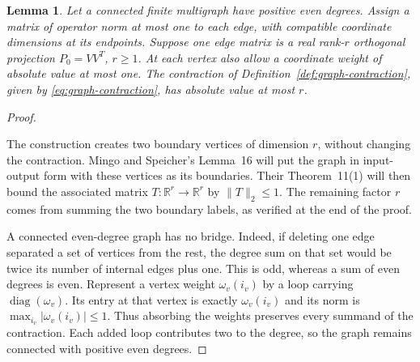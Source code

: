 \documentclass[11pt]{article}
\newtheorem{lemma}[theorem]{Lemma}
\theoremstyle{definition}
\theoremstyle{remark}
\theoremstyle{plain}
\newcommand{\R}{\mathbb R}
\DeclareMathOperator{\diag}{diag}
\begin{document}
\begin{lemma}\label{lem:graph}
Let a connected finite multigraph have positive even degrees. Assign
a matrix of operator norm at most one to each edge, with compatible
coordinate dimensions at its endpoints. Suppose one edge matrix is a
real rank-\(r\) orthogonal projection \(P_0=VV^T\), \(r\ge1\).
At each vertex also allow a coordinate weight of absolute value at most
one. The contraction of Definition~\ref{def:graph-contraction},
given by \eqref{eq:graph-contraction}, has absolute value
at most \(r\).
\end{lemma}
\begin{proof}
\begin{samepage}
The construction creates two boundary vertices of dimension $r$, without
changing the contraction. Mingo and Speicher's Lemma~16
\cite{mingo} will put the graph in input-output form with these
vertices as its boundaries. Their Theorem~11(1) will then bound
the associated matrix $T:\R^r\to\R^r$ by $\|T\|_2\le1$.
The remaining factor $r$ comes from summing the two boundary
labels, as verified at the end of the proof.
\par
\end{samepage}

A connected even-degree graph has no bridge. Indeed, if deleting one
edge separated a set of vertices from the rest, the degree sum on
that set would be twice its number of internal edges plus one.
This is odd, whereas a sum of even degrees is even.
Represent a vertex weight $\omega_v(i_v)$ by a loop carrying
$\diag(\omega_v)$. Its entry at that vertex is exactly
$\omega_v(i_v)$ and its norm is $\max_{i_v}|\omega_v(i_v)|\le1$.
Thus absorbing the weights preserves every summand of the
contraction. Each added loop contributes two to the degree, so
the graph remains connected with positive even degrees.


\end{proof}
\end{document}
